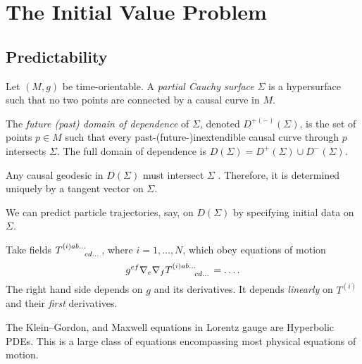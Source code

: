 \chapter{The Initial Value Problem}%
\label{cha:the_initial_value_problem}

\section{Predictability}%
\label{sec:predictability}

\begin{definition}
  Let $(M, g)$ be time-orientable. A \emph{partial Cauchy surface} $\Sigma$ is a hypersurface such that no two points are connected by a causal curve in $M$.
\end{definition}
\begin{definition}
  The \emph{future (past) domain of dependence} of $\Sigma$, denoted $D^{+ (-)}(\Sigma)$, is the set of points $p \in M$ such that every past-(future-)inextendible causal curve through $p$ intersects $\Sigma$.
  The full domain of dependence is $D(\Sigma) = D^+(\Sigma) \cup D^-(\Sigma)$.
\end{definition}

Any causal geodesic in $D(\Sigma)$  must intersect $\Sigma$ . Therefore, it is determined uniquely by a tangent vector on $\Sigma$.
\begin{leftbar}
  We can predict particle trajectories, say, on $D(\Sigma)$ by specifying initial data on $\Sigma$.
\end{leftbar}
\begin{figure}[tbhp]
  \centering
  \def\svgwidth{0.4\columnwidth}
  
  \caption{}
  \label{fig:l6f4}
\end{figure}

\begin{definition}
  Take fields $T \indices{^{(i)a b \dots}_{c d \dots}}$, where $i = 1, \dots, N$, which obey equations of motion
  \begin{equation}
    g^{ef} \nabla_{e} \nabla_{f} T \indices{^{(i)a b \dots}_{c d \dots}} = \dots.
  \end{equation}
  The right hand side depends on $g$ and its derivatives. It depends \emph{linearly} on $T^{(i)}$ and their \emph{first} derivatives.
\end{definition}
\begin{example}[]
  The Klein--Gordon, and Maxwell equations in Lorentz gauge are Hyperbolic PDEs. This is a large class of equations encompassing most physical equations of motion.
\end{example}

